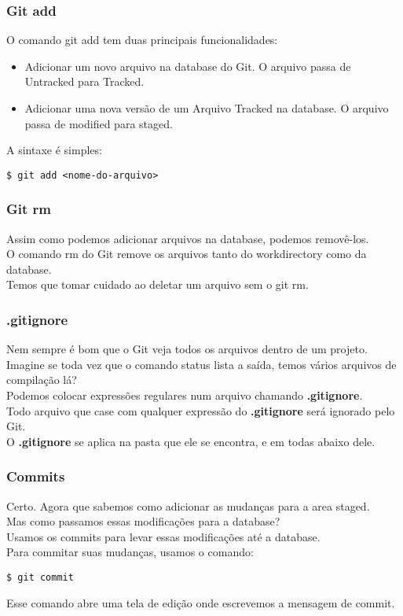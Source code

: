 \documentclass[brazil]{beamer}
\begin{document}
\begin{frame}[fragile]
  \frametitle{Git add}
  O comando git add tem duas principais funcionalidades:
  \begin{itemize}
    \item Adicionar um novo arquivo na database do Git. O arquivo passa de Untracked para Tracked.
    \item Adicionar uma nova versão de um Arquivo Tracked na database. O arquivo passa de modified para staged.
  \end{itemize}
  A sintaxe é simples:
  \begin{block}{}
    \verb#$ git add <nome-do-arquivo>#
  \end{block}
\end{frame}

\begin{frame}[fragile]
  \frametitle{Git rm}
  Assim como podemos adicionar arquivos na database, podemos removê-los. \\
  \pause
  O comando rm do Git remove os arquivos tanto do workdirectory como da database. \\
  \pause
  Temos que tomar cuidado ao deletar um arquivo sem o git rm.
\end{frame}

\begin{frame}[fragile]
  \frametitle{.gitignore}
  Nem sempre é bom que o Git veja todos os arquivos dentro de um projeto. \\
  \pause
  Imagine se toda vez que o comando status lista a saída, temos vários arquivos de compilação lá? \\
  \pause
  Podemos colocar expressões regulares num arquivo chamando \textbf{.gitignore}. \\
  \pause
  Todo arquivo que case com qualquer expressão do \textbf{.gitignore} será ignorado pelo Git. \\
  \pause
  O \textbf{.gitignore} se aplica na pasta que ele se encontra, e em todas abaixo dele. 
\end{frame}

\begin{frame}[fragile]
  \frametitle{Commits}
  Certo. Agora que sabemos como adicionar as mudanças para a area staged. \\
  Mas como passamos essas modificações para a database? \\
  \pause
  Usamos os commits para levar essas modificações até a database. \\
  Para commitar suas mudanças, usamos o comando:
  \begin{block}{}
    \verb#$ git commit#
  \end{block}
  Esse comando abre uma tela de edição onde escrevemos a mensagem de commit. 
\end{frame}
\end{document}
